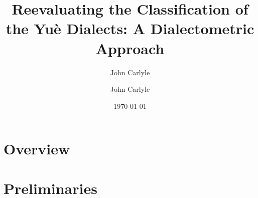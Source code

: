 \documentclass[a4paper,12pt]{article}
\author{John Carlyle}
\affiliation{University of Washington \email{jtcarlyl@uw.edu}}
\author{John Carlyle}
\date{\today}
\title{Reevaluating the Classification of the Yuè Dialects: A Dialectometric Approach}
\begin{document}
\maketitle

\section*{Overview}
\label{sec:orgb16810f}

\section*{Preliminaries}
\label{sec:org39e9893}

\newpage
\printbibliography
\end{document}
